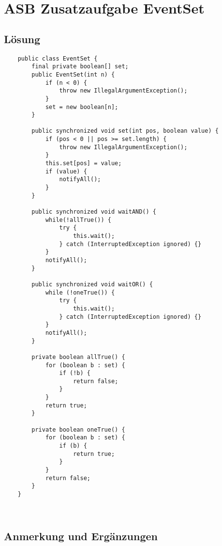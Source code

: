 \chapter{ASB Zusatzaufgabe EventSet}\label{ch:eventset}


\section{Lösung}

\begin{verbatim}
    public class EventSet {
        final private boolean[] set;
        public EventSet(int n) {
            if (n < 0) {
                throw new IllegalArgumentException();
            }
            set = new boolean[n];
        }

        public synchronized void set(int pos, boolean value) {
            if (pos < 0 || pos >= set.length) {
                throw new IllegalArgumentException();
            }
            this.set[pos] = value;
            if (value) {
                notifyAll();
            }
        }

        public synchronized void waitAND() {
            while(!allTrue()) {
                try {
                    this.wait();
                } catch (InterruptedException ignored) {}
            }
            notifyAll();
        }

        public synchronized void waitOR() {
            while (!oneTrue()) {
                try {
                    this.wait();
                } catch (InterruptedException ignored) {}
            }
            notifyAll();
        }

        private boolean allTrue() {
            for (boolean b : set) {
                if (!b) {
                    return false;
                }
            }
            return true;
        }

        private boolean oneTrue() {
            for (boolean b : set) {
                if (b) {
                    return true;
                }
            }
            return false;
        }
    }
\end{verbatim}\\


\section{Anmerkung und Ergänzungen}

